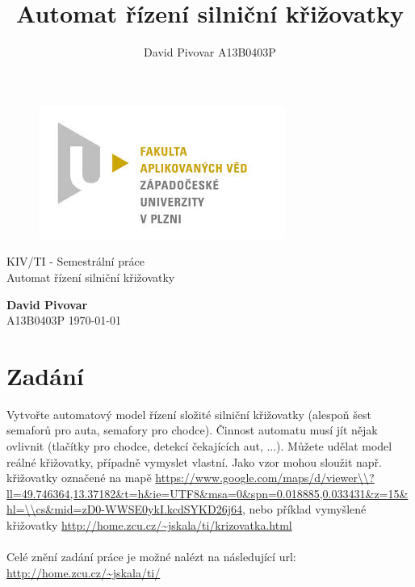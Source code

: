 \documentclass[12pt, a4paper]{report}
\title{\textbf{Automat řízení silniční křižovatky}}
\author{David Pivovar A13B0403P}
\begin{document}
\begin{titlepage}

\begin{figure}[t]
\centering
	\includegraphics{image/logo_fav.jpg}
	\label{fig:logo_fav}
\end{figure}

\begin{center}
	{\large KIV/TI - Semestrální práce\\[0.3cm]}
	{\huge Automat řízení silniční křižovatky \\[1.7cm] }
\end{center}

\vfill

\begin{flushleft}
	{\large \textbf{David Pivovar}\\}
	{\large A13B0403P}
	\hfill
	{\large \today}
\end{flushleft}

\end{titlepage}


\tableofcontents

\listoffigures


\chapter{Zadání}
Vytvořte automatový model řízení složité silniční křižovatky (alespoň šest semaforů pro auta, semafory pro chodce). Činnost automatu musí jít nějak ovlivnit (tlačítky pro chodce, detekcí čekajících aut, ...). Můžete udělat model reálné křižovatky, případně vymyslet vlastní. Jako vzor mohou sloužit např. křižovatky označené na mapě \url{https://www.google.com/maps/d/viewer\\?ll=49.746364,13.37182&t=h&ie=UTF8&msa=0&spn=0.018885,0.033431&z=15&hl=\\cs&mid=zD0-WWSE0ykI.kcdSYKD26j64}, nebo příklad vymyšlené křižovatky \url{http://home.zcu.cz/~jskala/ti/krizovatka.html}\\
\\
\noindent
Celé znění zadání práce je možné nalézt na následující url:\\
\url{http://home.zcu.cz/~jskala/ti/}
\end{document}
